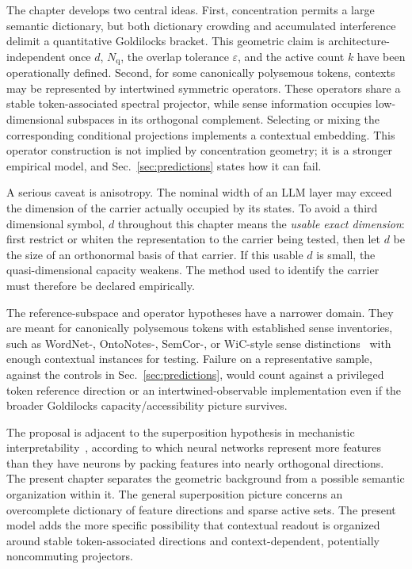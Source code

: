 \documentclass[
  aps,
  reprint,
  superscriptaddress,
  floatfix,
  nofootinbib,
  longbibliography
]{revtex4-2}
\newcommand{\Nq}{N_{\mathrm q}}
\begin{document}
The chapter develops two central ideas.  First, concentration permits a large
semantic dictionary, but both dictionary crowding and accumulated
interference delimit a quantitative Goldilocks bracket.  This geometric claim
is architecture-independent once $d$, $\Nq$, the overlap tolerance
$\varepsilon$, and the active count $k$ have been operationally defined.
Second, for some canonically
polysemous tokens, contexts may be represented by intertwined symmetric
operators.  These operators share a stable token-associated spectral
projector, while sense information occupies low-dimensional subspaces in its
orthogonal complement.  Selecting or mixing the corresponding conditional
projections implements a contextual embedding.  This operator construction
is not implied by concentration geometry; it is a stronger empirical model,
and Sec.~\ref{sec:predictions} states how it can fail.

A serious caveat is anisotropy.  The nominal width of an LLM layer may exceed
the dimension of the carrier actually occupied by its states.  To avoid a
third dimensional symbol, $d$ throughout this chapter means the \emph{usable
exact dimension}: first restrict or whiten the representation to the carrier
being tested, then let $d$ be the size of an orthonormal basis of that carrier.
If this usable $d$ is small, the quasi-dimensional capacity weakens.  The
method used to identify the carrier must therefore be declared empirically.

The reference-subspace and operator hypotheses have a narrower domain. They
are meant for
canonically polysemous tokens with established sense inventories, such
as WordNet-, OntoNotes-, SemCor-, or WiC-style sense
distinctions~\cite{pilehvar2019wic} with enough contextual instances
for testing. Failure on a representative sample, against the controls in
Sec.~\ref{sec:predictions}, would count against a privileged token reference
direction or an intertwined-observable implementation even if the broader
Goldilocks capacity/accessibility picture survives.

The proposal is adjacent to the superposition hypothesis in mechanistic
interpretability~\cite{elhage2022superposition}, according to which neural networks
represent more features than they have neurons by packing features into
nearly orthogonal directions. The present chapter separates the
geometric background from a possible semantic organization within it.
The general superposition picture concerns an overcomplete dictionary
of feature directions and sparse active sets. The present model adds the more
specific possibility that contextual readout is organized around stable
token-associated directions and context-dependent, potentially noncommuting
projectors.
\end{document}
